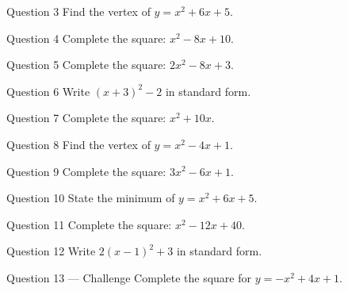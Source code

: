 \documentclass[11pt]{article}
\begin{document}
\begin{qbox}{Question 3}
Find the vertex of $y=x^2+6x+5$.\workspace{2.4cm}
\end{qbox}

\begin{qbox}{Question 4}
Complete the square: $x^2-8x+10$.\workspace{2.4cm}
\end{qbox}

\begin{qbox}{Question 5}
Complete the square: $2x^2-8x+3$.\workspace{2.4cm}
\end{qbox}

\begin{qbox}{Question 6}
Write $(x+3)^2-2$ in standard form.\workspace{2.4cm}
\end{qbox}

\begin{qbox}{Question 7}
Complete the square: $x^2+10x$.\workspace{2.4cm}
\end{qbox}

\begin{qbox}{Question 8}
Find the vertex of $y=x^2-4x+1$.\workspace{2.4cm}
\end{qbox}

\begin{qbox}{Question 9}
Complete the square: $3x^2-6x+1$.\workspace{2.4cm}
\end{qbox}

\begin{qbox}{Question 10}
State the minimum of $y=x^2+6x+5$.\workspace{2.4cm}
\end{qbox}

\begin{qbox}{Question 11}
Complete the square: $x^2-12x+40$.\workspace{2.4cm}
\end{qbox}

\begin{qbox}{Question 12}
Write $2(x-1)^2+3$ in standard form.\workspace{2.4cm}
\end{qbox}

\begin{qbox}{Question 13 --- Challenge}
Complete the square for $y=-x^2+4x+1$.\workspace{3cm}
\end{qbox}

\clearpage
{}
\end{document}
